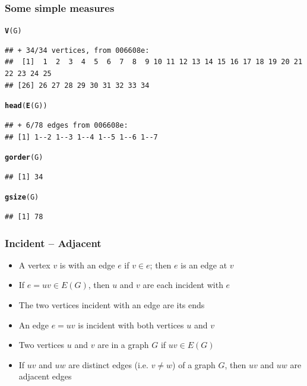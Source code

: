 \documentclass[aspectratio=169]{beamer}\usepackage[]{graphicx}\usepackage[]{xcolor}
\makeatletter
\newcommand{\hldef}[1]{\textcolor[rgb]{0.345,0.345,0.345}{#1}}%
\newcommand{\hlkwd}[1]{\textcolor[rgb]{0.737,0.353,0.396}{\textbf{#1}}}%
\newenvironment{kframe}{%
 \def\at@end@of@kframe{}%
 \ifinner\ifhmode%
  \def\at@end@of@kframe{\end{minipage}}%
  \begin{minipage}{\columnwidth}%
 \fi\fi%
 \def\FrameCommand##1{\hskip\@totalleftmargin \hskip-\fboxsep
 \colorbox{shadecolor}{##1}\hskip-\fboxsep
     \hskip-\linewidth \hskip-\@totalleftmargin \hskip\columnwidth}%
 \MakeFramed {\advance\hsize-\width
   \@totalleftmargin\z@ \linewidth\hsize
   \@setminipage}}%
 {\par\unskip\endMakeFramed%
 \at@end@of@kframe}
\newenvironment{knitrout}{}{} %
\makeatother
\begin{document}
\begin{frame}[fragile]\frametitle{Some simple measures}
\begin{knitrout}
\color{fgcolor}\begin{kframe}
\begin{alltt}
\hlkwd{V}\hldef{(G)}
\end{alltt}
\begin{verbatim}
## + 34/34 vertices, from 006608e:
##  [1]  1  2  3  4  5  6  7  8  9 10 11 12 13 14 15 16 17 18 19 20 21 22 23 24 25
## [26] 26 27 28 29 30 31 32 33 34
\end{verbatim}
\begin{alltt}
\hlkwd{head}\hldef{(}\hlkwd{E}\hldef{(G))}
\end{alltt}
\begin{verbatim}
## + 6/78 edges from 006608e:
## [1] 1--2 1--3 1--4 1--5 1--6 1--7
\end{verbatim}
\begin{alltt}
\hlkwd{gorder}\hldef{(G)}
\end{alltt}
\begin{verbatim}
## [1] 34
\end{verbatim}
\begin{alltt}
\hlkwd{gsize}\hldef{(G)}
\end{alltt}
\begin{verbatim}
## [1] 78
\end{verbatim}
\end{kframe}
\end{knitrout}
\end{frame}

\begin{frame}\frametitle{Incident -- Adjacent}
	\begin{definition}[Incident]
	\begin{itemize}
	\item A vertex $v$ is  with an edge $e$ if $v\in e$; then $e$ is an edge at $v$
	\item If $e=uv\in E(G)$, then $u$ and $v$ are each incident with $e$
	\item The two vertices incident with an edge are its ends
	\item An edge $e=uv$ is incident with both vertices $u$ and $v$
	\end{itemize}
	\end{definition}
	\vfill
	\begin{definition}[Adjacent]
	\begin{itemize}
	\item Two vertices $u$ and $v$ are  in a graph $G$ if $uv\in E(G)$
	\item If $uv$ and $uw$ are distinct edges (i.e. $v\not=w$) of a graph $G$, then $uv$ and $uw$ are adjacent edges
	\end{itemize}
	\end{definition}
\end{frame}
\end{document}
